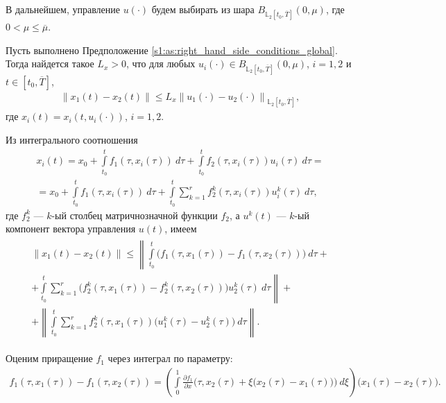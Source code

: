 \documentclass[../main.tex]{subfiles}
\begin{document}
В дальнейшем, управление $ u(\cdot) $ будем выбирать из шара $ B_{\mathbb{L}_2[t_0, \overline{T}]}(0,\mu) $, где $ 0 < \mu \leqslant \overline{\mu} $.
 
\begin{lemma}\label{s1:lem:lip_of_solutions_global}
 Пусть выполнено Предположение \ref{s1:as:right_hand_side_conditions_global}.
 Тогда найдется такое $L_x > 0$, что для любых $u_i(\cdot) \in B_{\mathbb{L}_2[t_0, \overline{T}]}(0,\mu) $, $i = 1,2$ и $t \in [t_0, \overline{T}]$, 
 \begin{gather*}
 \left\| x_1(t) - x_2(t) \right\| \leqslant L_x \left\|u_1(\cdot) - u_2(\cdot) \right\|_{\mathbb{L}_2[t_0, \overline{T}]}, 
 \end{gather*}
 где $x_i(t) = x_i(t,u_i(\cdot))$, $i = 1,2$. 
\end{lemma}
\doc
Из интегрального соотношения
\begin{gather*}
 x_i(t) = x_0 
 + \int\limits_{t_0}^{t} f_1(\tau, x_i(\tau))\ d\tau 
 + \int\limits_{t_0}^{t} f_2(\tau,x_i(\tau))u_i(\tau)\ d\tau 
 = \\ = 
 x_0 
 + \int\limits_{t_0}^{t} f_1(\tau, x_i(\tau))\ d\tau 
 + \int\limits_{t_0}^{t} 
 \sum\limits_{k = 1}^{r} 
 f_2^k(\tau,x_i(\tau))u_i^k(\tau)\ d\tau,
\end{gather*}
где $f_2^k$ --- $k$-ый столбец матричнозначной функции $f_2$, а $u^k(t)$ --- $k$-ый компонент вектора управления $u(t)$, имеем 
\begin{gather}\label{s1:diff_of_solution}
\begin{gathered}
 \| x_1(t) - x_2(t) \| 
 \leqslant 
 \left\| 
 \int\limits_{t_0}^{t} \Big( f_1(\tau, x_1(\tau)) - f_1(\tau, x_2(\tau)) \Big) \ d\tau 
 \right.
 + \\ + 
 \left.
 \int\limits_{t_0}^{t} 
 \sum\limits_{k = 1}^{r}
 \Big( f_2^k(\tau, x_1(\tau)) - f_2^k(\tau, x_2(\tau)) \Big) u_2^k(\tau) \ d\tau 
 \right\| 
 + \\ +
 \left\| 
 \int\limits_{t_0}^{t} 
 \sum\limits_{k = 1}^{r}
 f_2^k(\tau,x_1(\tau)) \big( u_1^k(\tau) - u_2^k(\tau) \big) \ d\tau 
 \right\|. 
\end{gathered}
\end{gather}

Оценим приращение $f_1$ через интеграл по параметру:
\begin{gather}\label{s1:meanvalue_f1}
		f_1(\tau, x_1(\tau)) - f_1(\tau, x_2(\tau)) = \left( \int\limits_0^1 \frac{\partial f_1}{\partial x} \Big(\tau, x_2(\tau) + \xi \big(x_2(\tau) - x_1(\tau)\big)\Big) \ d\xi \right) \big(x_1(\tau) - x_2(\tau)\big).
\end{gather}
\end{document}
